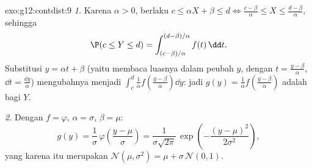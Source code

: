 \begin{solution}{exo:g12:contdist:9}
\emph{1.} Karena $\alpha > 0$, berlaku $c \leq \alpha X + \beta \leq d
\iff \frac{c - \beta}{\alpha} \leq X \leq \frac{d - \beta}{\alpha}$, sehingga
\[
\P(c \leq Y \leq d)
= \int_{(c-\beta)/\alpha}^{(d-\beta)/\alpha} f(t)\,\dd t .
\]
Substitusi $y = \alpha t + \beta$ (yaitu membaca luasnya dalam peubah $y$,
dengan $t = \frac{y - \beta}{\alpha}$, $\dd t = \frac{\dd y}{\alpha}$)
mengubahnya menjadi
$\int_c^d \frac{1}{\alpha} f\left(\frac{y-\beta}{\alpha}\right)\dd y$: jadi
 $g(y) = \frac1\alpha f\left(\frac{y-\beta}{\alpha}\right)$ adalah
 bagi $Y$.

\emph{2.} Dengan $f = \varphi$, $\alpha = \sigma$, $\beta = \mu$:
\[
g(y) = \frac{1}{\sigma}\,\varphi\!\left(\frac{y - \mu}{\sigma}\right)
= \frac{1}{\sigma\sqrt{2\pi}}\,
\exp\left(-\frac{(y-\mu)^2}{2\sigma^2}\right),
\]
yang karena itu merupakan 
$\mathcal N(\mu, \sigma^2) = \mu + \sigma\,\mathcal N(0,1)$.
\end{solution}

